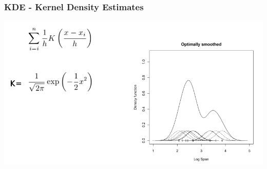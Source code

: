 \documentclass{beamer}
\begin{document}
\begin{frame}
\frametitle{KDE - Kernel Density Estimates}
\begin{center}
\includegraphics[scale=0.38]{kde1}
\end{center}
\end{frame}
\end{document}
